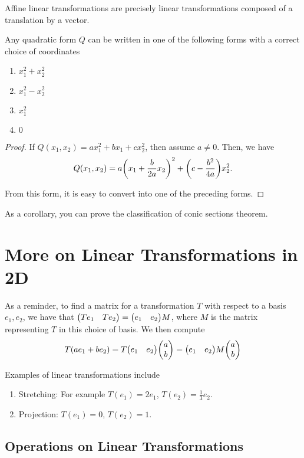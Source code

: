 Affine linear transformations are precisely linear transformations composed of a translation by a vector.

\begin{theorem}
    Any quadratic form $Q$ can be written in one of the following forms with a correct choice of coordinates
    \begin{enumerate}
        \item $x_1^2 + x_2^2$
        \item $x_1^2 - x_2^2$
        \item $x_1^2$ 
        \item $0$
    \end{enumerate} 
\end{theorem}

\begin{proof}
    If $Q(x_1, x_2) = ax_1^2 + bx_1 + cx_2^2$, then assume $a \ne 0$. Then, we have \[Q(x_1, x_2) = a\qty(x_1 + \frac{b}{2a}x_2)^2 + \qty(c- \frac{b^2}{4a})x_2^2.\]

    From this form, it is easy to convert into one of the preceding forms.
\end{proof}

As a corollary, you can prove the classification of conic sections theorem.

\section{More on Linear Transformations in 2D}

As a reminder, to find a matrix for a transformation $T$ with respect to a basis $e_1, e_2$, we have that $\mqty(Te_1 & Te_2) = \mqty(e_1 & e_2)M$, where $M$ is the matrix representing $T$ in this choice of basis. We then compute \[T(ae_1 + be_2) = T\mqty(e_1 & e_2)\mqty(a \\ b) = \mqty(e_1 & e_2)M\mqty(a \\ b)\]

Examples of linear transformations include 
\begin{enumerate}
    \item Stretching: For example $T(e_1) = 2e_1$, $T(e_2) = \frac{1}{3}e_2$.
    \item Projection: $T(e_1) = 0$, $T(e_2) = 1$.
\end{enumerate}

\subsection{Operations on Linear Transformations}

